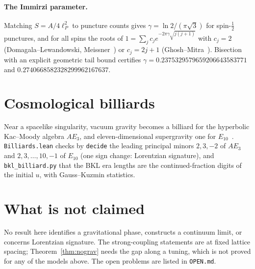 \documentclass[aps,prd,twocolumn,superscriptaddress,nofootinbib]{revtex4-2}
\theoremstyle{remark}
\begin{document}
\paragraph{The Immirzi parameter.} Matching $S=A/4\ell_P^2$ to puncture counts gives $\gamma=\ln2/(\pi\sqrt3)$ for
spin-$\frac12$ punctures, and for all spins the roots of $1=\sum_j c_j e^{-2\pi\gamma\sqrt{j(j+1)}}$ with $c_j=2$
(Domagala--Lewandowski, Meissner~\cite{DL,Meissner}) or $c_j=2j+1$ (Ghosh--Mitra~\cite{GM}). Bisection with an
explicit geometric tail bound certifies $\gamma=0.2375329579659206643583771$ and $0.2740668582328299962167637$.

\section{Cosmological billiards}

Near a spacelike singularity, vacuum gravity becomes a billiard for the hyperbolic Kac--Moody algebra $AE_3$, and
eleven-dimensional supergravity one for $E_{10}$~\cite{DHN}. \texttt{Billiards.lean} checks by \texttt{decide} the
leading principal minors $2,3,-2$ of $AE_3$ and $2,3,\dots,10,-1$ of $E_{10}$ (one sign change: Lorentzian
signature), and \texttt{bkl\_billiard.py} that the BKL era lengths are the continued-fraction digits of the initial
$u$, with Gauss--Kuzmin statistics.

\section{What is not claimed}

No result here identifies a gravitational phase, constructs a continuum limit, or concerns Lorentzian signature.
The strong-coupling statements are at fixed lattice spacing; Theorem~\ref{thm:nograv} needs the gap along a tuning,
which is not proved for any of the models above. The open problems are listed in \texttt{OPEN.md}.
\end{document}
